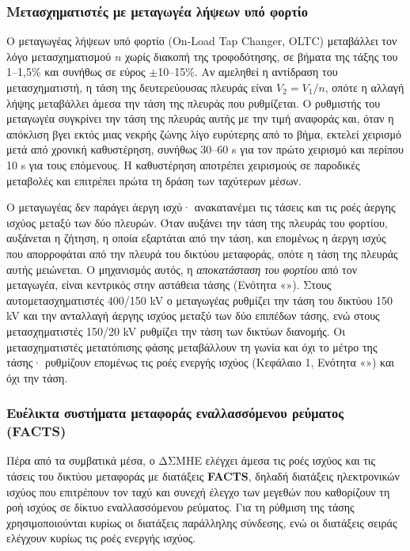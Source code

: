 \subsubsection{Μετασχηματιστές με μεταγωγέα λήψεων υπό φορτίο}
\label{sec:oltc}

Ο μεταγωγέας λήψεων υπό φορτίο (On-Load Tap Changer, OLTC) μεταβάλλει τον λόγο
μετασχηματισμού $n$ χωρίς διακοπή της τροφοδότησης, σε βήματα της τάξης του 1--1,5\% και
συνήθως σε εύρος $\pm$10--15\%. Αν αμεληθεί η αντίδραση του μετασχηματιστή, η τάση της
δευτερεύουσας πλευράς είναι $V_2 = V_1/n$, οπότε η αλλαγή λήψης μεταβάλλει άμεσα την τάση
της πλευράς που ρυθμίζεται. Ο ρυθμιστής του μεταγωγέα συγκρίνει την τάση της πλευράς αυτής με
την τιμή αναφοράς και, όταν η απόκλιση βγει εκτός μιας νεκρής ζώνης λίγο ευρύτερης από το
βήμα, εκτελεί χειρισμό μετά από χρονική καθυστέρηση, συνήθως 30--60 s για τον πρώτο χειρισμό
και περίπου 10 s για τους επόμενους. Η καθυστέρηση αποτρέπει χειρισμούς σε παροδικές
μεταβολές και επιτρέπει πρώτα τη δράση των ταχύτερων μέσων.

Ο μεταγωγέας δεν παράγει άεργη ισχύ· ανακατανέμει τις τάσεις και τις ροές άεργης ισχύος
μεταξύ των δύο πλευρών. Όταν αυξάνει την τάση της πλευράς του φορτίου, αυξάνεται η ζήτηση, η
οποία εξαρτάται από την τάση, και επομένως η άεργη ισχύς που απορροφάται από την πλευρά του
δικτύου μεταφοράς, οπότε η τάση της πλευράς αυτής μειώνεται. Ο μηχανισμός αυτός, η
\emph{αποκατάσταση του φορτίου} από τον μεταγωγέα, είναι κεντρικός στην αστάθεια τάσης
(Ενότητα «»). Στους αυτομετασχηματιστές 400/150 kV ο μεταγωγέας
ρυθμίζει την τάση του δικτύου 150 kV και την ανταλλαγή άεργης ισχύος μεταξύ των δύο επιπέδων
τάσης, ενώ στους μετασχηματιστές 150/20 kV ρυθμίζει την τάση των δικτύων διανομής. Οι
μετασχηματιστές μετατόπισης φάσης μεταβάλλουν τη γωνία και όχι το μέτρο της τάσης· ρυθμίζουν
επομένως τις ροές ενεργής ισχύος (Κεφάλαιο 1, Ενότητα «») και όχι την τάση.

\subsubsection{Ευέλικτα συστήματα μεταφοράς εναλλασσόμενου ρεύματος (FACTS)}
\label{sec:facts}

Πέρα από τα συμβατικά μέσα, ο ΔΣΜΗΕ ελέγχει άμεσα τις ροές ισχύος και τις τάσεις του δικτύου
μεταφοράς με διατάξεις \textbf{FACTS}, δηλαδή διατάξεις ηλεκτρονικών ισχύος που επιτρέπουν τον
ταχύ και συνεχή έλεγχο των μεγεθών που καθορίζουν τη ροή ισχύος σε δίκτυο εναλλασσόμενου
ρεύματος. Για τη ρύθμιση της τάσης χρησιμοποιούνται κυρίως οι διατάξεις παράλληλης σύνδεσης,
ενώ οι διατάξεις σειράς ελέγχουν κυρίως τις ροές ενεργής ισχύος.


